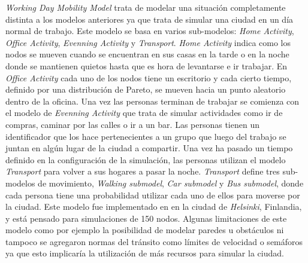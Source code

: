 \textit{Working Day Mobility Model} \cite{ekman_working_2008} trata de modelar
una situación completamente distinta a los modelos anteriores ya que trata de
simular una ciudad en un día normal de trabajo. Este modelo se basa en varios
sub-modelos: \textit{Home Activity}, \textit{Office Activity}, \textit{Evenning
Activity} y \textit{Transport}. \textit{Home Activity} indica como los nodos se
mueven cuando se encuentran en sus casas en la tarde o en la noche donde se
mantienen quietos hasta que es hora de levantarse e ir trabajar. En
\textit{Office Activity} cada uno de los nodos tiene un escritorio y cada cierto
tiempo, definido por una distribución de Pareto, se mueven hacia un punto
aleatorio dentro de la oficina. Una vez las personas terminan de trabajar se
comienza con el modelo de \textit{Evenning Activity} que trata de simular
actividades como ir de compras, caminar por las calles o ir a un bar. Las
personas tienen un identificador que los hace pertenecientes a un grupo que
luego del trabajo se juntan en algún lugar de la ciudad a compartir. Una vez ha
pasado un tiempo definido en la configuración de la simulación, las personas
utilizan el modelo \textit{Transport} para volver a sus hogares a pasar la
noche. \textit{Transport} define tres sub-modelos de movimiento, \textit{Walking
submodel}, \textit{Car submodel} y \textit{Bus submodel}, donde cada persona
tiene una probabilidad utilizar cada uno de ellos para moverse por la ciudad.
Este modelo fue implementado en \theone{} en la ciudad de \textit{Helsinki},
Finlandia, y está pensado para simulaciones de 150 nodos. Algunas limitaciones
de este modelo como por ejemplo la posibilidad de modelar paredes u obstáculos
ni tampoco se agregaron normas del tránsito como límites de velocidad o
semáforos ya que esto implicaría la utilización de más recursos para simular la
ciudad.


